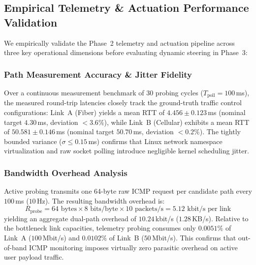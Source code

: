 \documentclass[conference]{IEEEtran}
\begin{document}
\textcolor{extensioncolor}{
\subsection{Empirical Telemetry \& Actuation Performance Validation}
\label{subsec:empirical_telemetry_results}

We empirically validate the Phase~2 telemetry and actuation pipeline across three key operational dimensions before evaluating dynamic steering in Phase~3:

\subsubsection{Path Measurement Accuracy \& Jitter Fidelity}
Over a continuous measurement benchmark of 30 probing cycles ($T_{\text{poll}} = 100$\,ms), the measured round-trip latencies closely track the ground-truth traffic control configurations: Link~A (Fiber) yields a mean RTT of $4.456 \pm 0.123$\,ms (nominal target $4.30$\,ms, deviation $<3.6\%$), while Link~B (Cellular) exhibits a mean RTT of $50.581 \pm 0.146$\,ms (nominal target $50.70$\,ms, deviation $<0.2\%$). The tightly bounded variance ($\sigma \le 0.15$\,ms) confirms that Linux network namespace virtualization and raw socket polling introduce negligible kernel scheduling jitter.

\subsubsection{Bandwidth Overhead Analysis}
Active probing transmits one 64-byte raw ICMP request per candidate path every $100$\,ms ($10$\,Hz). The resulting bandwidth overhead is:
\begin{equation}
R_{\text{probe}} = 64\text{ bytes} \times 8\text{ bits/byte} \times 10\text{ packets/s} = 5.12\text{ kbit/s per link}
\end{equation}
yielding an aggregate dual-path overhead of $10.24$\,kbit/s ($1.28$\,KB/s). Relative to the bottleneck link capacities, telemetry probing consumes only $0.0051\%$ of Link~A ($100$\,Mbit/s) and $0.0102\%$ of Link~B ($50$\,Mbit/s). This confirms that out-of-band ICMP monitoring imposes virtually zero parasitic overhead on active user payload traffic.

}
\end{document}
